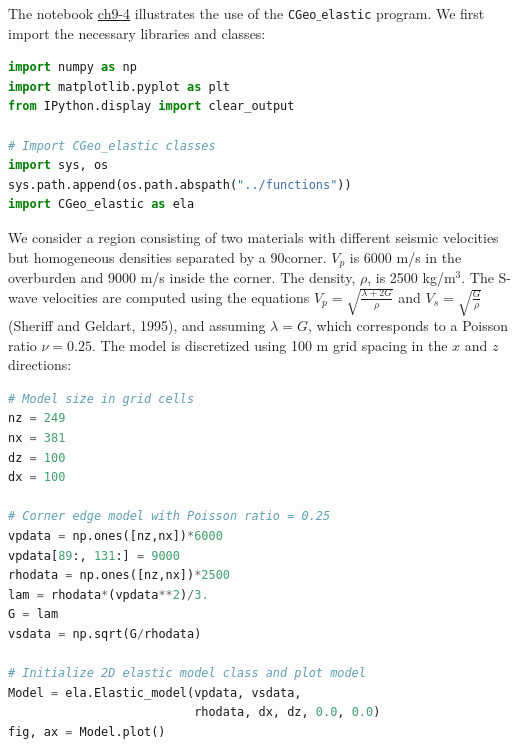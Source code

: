 \documentclass[a4paper , 12pt]{book}
\newcommand{\code}[1]{\colorbox{light-gray}{\texttt{#1}}}
\begin{document}
The notebook \href{https://github.com/nfcd/compGeo/blob/master/source/notebooks/ch9-4.ipynb}{ch9-4} illustrates the use of the \code{CGeo$\_$elastic} program. We first import the necessary libraries and classes:

\begin{lstlisting}[language=Python, frame=single]
import numpy as np
import matplotlib.pyplot as plt
from IPython.display import clear_output

# Import CGeo_elastic classes
import sys, os
sys.path.append(os.path.abspath("../functions"))
import CGeo_elastic as ela
\end{lstlisting}

We consider a region consisting of two materials with different seismic velocities but homogeneous densities separated by a 90\degree corner. $V_p$ is 6000 m/s in the overburden and 9000 m/s inside the corner. The density, $\rho$, is 2500 kg/m$^3$. The S-wave velocities are computed using the equations $V_p = \sqrt{\frac{\lambda + 2G}{\rho}}$ and $V_s = \sqrt{\frac{G}{\rho}}$ (Sheriff and Geldart, 1995), and assuming $\lambda = G$, which corresponds to a Poisson ratio $\nu = 0.25$. The model is discretized using 100 m grid spacing in the $x$ and $z$ directions:

\begin{center}
\begin{lstlisting}[language=Python, frame=single]
# Model size in grid cells
nz = 249
nx = 381
dz = 100 
dx = 100

# Corner edge model with Poisson ratio = 0.25
vpdata = np.ones([nz,nx])*6000
vpdata[89:, 131:] = 9000
rhodata = np.ones([nz,nx])*2500
lam = rhodata*(vpdata**2)/3. 
G = lam 
vsdata = np.sqrt(G/rhodata)

# Initialize 2D elastic model class and plot model
Model = ela.Elastic_model(vpdata, vsdata, 
                          rhodata, dx, dz, 0.0, 0.0) 
fig, ax = Model.plot()
\end{lstlisting}
\end{center}
\end{document}
